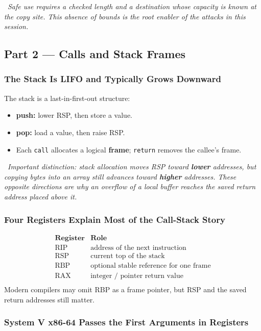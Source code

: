 \documentclass[hidelinks]{article}
\newcommand{\callout}[1]{\par\smallskip\noindent{\color{capri}$\blacktriangleright$}\ \textit{#1}\par\smallskip}
\begin{document}
\callout{Safe use requires a checked length and a destination whose capacity is known at the copy site. This absence of bounds is the root enabler of the attacks in this session.}

\subsection{Part 2 --- Calls and Stack Frames}

\subsubsection{The Stack Is LIFO and Typically Grows Downward}

The stack is a last-in-first-out structure:
\begin{itemize}
    \item \textbf{push:} lower RSP, then store a value.
    \item \textbf{pop:} load a value, then raise RSP.
    \item Each \texttt{call} allocates a logical \textbf{frame}; \texttt{return} removes the callee's frame.
\end{itemize}

\callout{Important distinction: stack \emph{allocation} moves RSP toward \textbf{lower} addresses, but copying bytes into an array still advances toward \textbf{higher} addresses. These opposite directions are why an overflow of a local buffer reaches the saved return address placed above it.}

\subsubsection{Four Registers Explain Most of the Call-Stack Story}

\[
\begin{array}{ll}
\textbf{Register} & \textbf{Role}\\ \hline
\text{RIP} & \text{address of the next instruction}\\
\text{RSP} & \text{current top of the stack}\\
\text{RBP} & \text{optional stable reference for one frame}\\
\text{RAX} & \text{integer / pointer return value}\\
\end{array}
\]
Modern compilers may omit RBP as a frame pointer, but RSP and the saved return addresses still matter.

\subsubsection{System V x86-64 Passes the First Arguments in Registers}
\end{document}
